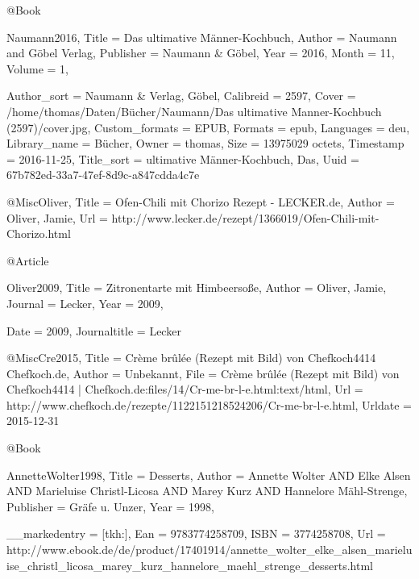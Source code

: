

@Book{Naumann2016,
  Title                    = {Das ultimative Männer-Kochbuch},
  Author                   = {Naumann and Göbel Verlag},
  Publisher                = {Naumann \& Göbel},
  Year                     = {2016},
  Month                    = {11},
  Volume                   = {1},

  Author_sort              = {Naumann \& Verlag, Göbel},
  Calibreid                = {2597},
  Cover                    = {/home/thomas/Daten/Bücher/Naumann/Das ultimative Manner-Kochbuch (2597)/cover.jpg},
  Custom_formats           = {EPUB},
  Formats                  = {epub},
  Languages                = {deu},
  Library_name             = {Bücher},
  Owner                    = {thomas},
  Size                     = {13975029 octets},
  Timestamp                = {2016-11-25},
  Title_sort               = {ultimative Männer-Kochbuch, Das},
  Uuid                     = {67b782ed-33a7-47ef-8d9c-a847cdda4c7e}
}

@Misc{Oliver,
  Title                    = {Ofen-Chili mit Chorizo Rezept - LECKER.de},
  Author                   = {Oliver, Jamie},
  Url                      = {http://www.lecker.de/rezept/1366019/Ofen-Chili-mit-Chorizo.html}
}

@Article{Oliver2009,
  Title                    = {Zitronentarte mit Himbeersoße},
  Author                   = {Oliver, Jamie},
  Journal                  = {Lecker},
  Year                     = {2009},

  Date                     = {2009},
  Journaltitle             = {Lecker}
}

@Misc{Cre2015,
  Title                    = {Crème brûlée (Rezept mit Bild) von Chefkoch4414 {\textbar} Chefkoch.de},
  Author                   = {Unbekannt},
  File                     = {Crème brûlée (Rezept mit Bild) von Chefkoch4414 | Chefkoch.de:files/14/Cr-me-br-l-e.html:text/html},
  Url                      = {http://www.chefkoch.de/rezepte/1122151218524206/Cr-me-br-l-e.html},
  Urldate                  = {2015-12-31}
}

@Book{AnnetteWolter1998,
  Title                    = {Desserts},
  Author                   = {Annette Wolter AND Elke Alsen AND Marieluise Christl-Licosa AND Marey Kurz AND Hannelore Mähl-Strenge},
  Publisher                = {Gräfe u. Unzer},
  Year                     = {1998},

  __markedentry            = {[tkh:]},
  Ean                      = {9783774258709},
  ISBN                     = {3774258708},
  Url                      = {http://www.ebook.de/de/product/17401914/annette_wolter_elke_alsen_marieluise_christl_licosa_marey_kurz_hannelore_maehl_strenge_desserts.html}
}


